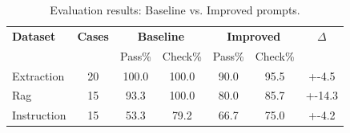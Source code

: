 \begin{table}[h]
\centering
\caption{Evaluation results: Baseline vs. Improved prompts.}
\label{tab:eval-results}
\begin{tabular}{@{}lcccccc@{}}
\toprule
\textbf{Dataset} & \textbf{Cases} & \multicolumn{2}{c}{\textbf{Baseline}} & \multicolumn{2}{c}{\textbf{Improved}} & \textbf{$\Delta$} \\
 & & Pass\% & Check\% & Pass\% & Check\% & \\
\midrule
Extraction & 20 & 100.0 & 100.0 & 90.0 & 95.5 & +-4.5 \\
Rag & 15 & 93.3 & 100.0 & 80.0 & 85.7 & +-14.3 \\
Instruction & 15 & 53.3 & 79.2 & 66.7 & 75.0 & +-4.2 \\
\bottomrule
\end{tabular}
\end{table}
